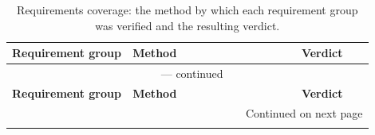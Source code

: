 \begingroup
\small
\begin{longtable}{p{0.30\linewidth} p{0.42\linewidth} p{0.18\linewidth}}
\caption[Requirements coverage and verdicts.]{Requirements coverage: the method by which each requirement group was verified and the resulting verdict.}
\label{tab:req-coverage} \\
\toprule
\textbf{Requirement group} & \textbf{Method} & \textbf{Verdict} \\
\midrule
\endfirsthead
\multicolumn{3}{c}{\tablename~\thetable{} --- continued} \\
\toprule
\textbf{Requirement group} & \textbf{Method} & \textbf{Verdict} \\
\midrule
\endhead
\midrule
\multicolumn{3}{r}{\footnotesize Continued on next page} \\
\endfoot
\bottomrule
\endlastfoot


\end{longtable}
